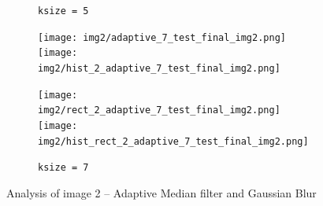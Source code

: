 \begin{figure}[H]
\begin{subfigure}[b]{0.24\textwidth}
        \caption{\lstinline|ksize = 5|}
        \label{fig:img2_add3}
    \end{subfigure}
    \begin{subfigure}[b]{0.24\textwidth}
        \texttt{[image: img2/adaptive\_7\_test\_final\_img2.png]}\\[0.1cm]
        \texttt{[image: img2/hist\_2\_adaptive\_7\_test\_final\_img2.png]}
        \begin{center}
        	\textbf{ }
        \end{center}
        \texttt{[image: img2/rect\_2\_adaptive\_7\_test\_final\_img2.png]}\\[0.1cm]
        \texttt{[image: img2/hist\_rect\_2\_adaptive\_7\_test\_final\_img2.png]}
        \caption{\lstinline|ksize = 7|}
        \label{fig:img2_add4}
    \end{subfigure}
    \caption{Analysis of image 2 -- Adaptive Median filter and Gaussian Blur}\label{fig:img2_add_test_e}
\end{figure}

